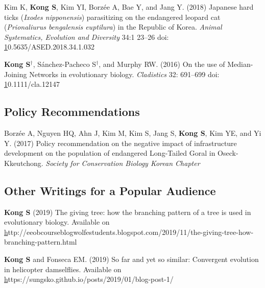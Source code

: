 \documentclass[11pt]{article}
\begin{document}
\begin{etaremune}
\item Kim K, \textbf{Kong S}, Kim YI, Borzée A, Bae Y, and Jang Y. (2018) Japanese hard ticks (\textit{Ixodes nipponensis}) parasitizing on the endangered leopard cat (\textit{Prionaliurus bengalensis euptilura}) in the Republic of Korea. \textit{Animal Systematics, Evolution and Diversity} 34:1 23–26 doi: \href{10.5635/ASED.2018.34.1.032}10.5635/ASED.2018.34.1.032
\item \textbf{Kong S}{$^\dag$}, Sánchez-Pacheco S{$^\dag$}, and Murphy RW. (2016) On the use of Median-Joining Networks in evolutionary biology. \textit{Cladistics} 32: 691–699 doi: \href{https://doi.org/10.1111/cla.12147}10.1111/cla.12147

\end{etaremune}

\subsection*{Policy Recommendations}
\begin{etaremune}


\item Borzée A, Nguyen HQ, Ahn J, Kim M, Kim S, Jang S, \textbf{Kong S}, Kim YE, and Yi Y. (2017) Policy recommendation on the negative impact of infrastructure development on the population of endangered Long-Tailed Goral in Oseck-Kkeutchong. \textit{Society for Conservation Biology Korean Chapter}

\end{etaremune}

\subsection*{Other Writings for a Popular Audience}
\begin{etaremune}

\item \textbf{Kong S} (2019) The giving tree: how the branching pattern of a tree is used in evolutionary biology. Available on \href{http://eeobcourseblogwolfestudents.blogspot.com/2019/11/the-giving-tree-how-branching-pattern.html}http://eeobcourseblogwolfestudents.blogspot.com/2019/11/the-giving-tree-how-branching-pattern.html
\item \textbf{Kong S} and Fonseca  EM. (2019) So far and yet so similar: Convergent evolution in helicopter damselflies. Available on \href{https://sungsko.github.io/posts/2019/01/blog-post-1/}https://sungsko.github.io/posts/2019/01/blog-post-1/



\end{etaremune}
\end{document}
